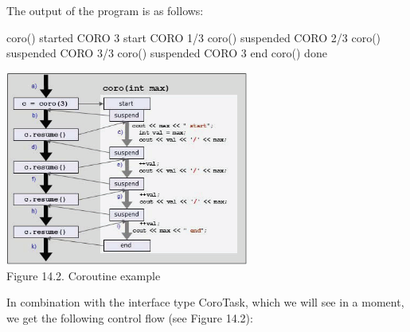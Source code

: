 The output of the program is as follows:

\begin{shell}
coro() started
         CORO 3 start
         CORO 1/3
coro() suspended
         CORO 2/3
coro() suspended
         CORO 3/3
coro() suspended
         CORO 3 end
coro() done
\end{shell}


\begin{center}
\includegraphics[width=0.6\textwidth]{content/chapter14/images/2.png}\\
Figure 14.2. Coroutine example
\end{center}

In combination with the interface type CoroTask, which we will see in a moment, we get the following control flow (see Figure 14.2):

